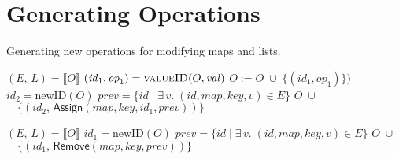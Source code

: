 \section{Generating Operations}\label{sect:appendix:generating-ops}

\begin{algorithm}
\caption{Generating new operations for modifying maps and lists.}\label{fig:pseudocode}
\noindent
\renewcommand\algorithmicindent{10pt}
\begin{minipage}[t]{0.5\textwidth}
\begin{algorithmic}[0]
    \State $(E,\, L) = \llbracket O \rrbracket$
    \State $(\mathit{id}_1, \mathit{op}_1) = \Call{valueID}{O, \mathit{val}}$
    \State $O := O \;\cup\; \big\{ (\mathit{id}_1, \mathit{op}_1) \big\})$
    \EndIf
    \State $\mathit{id}_2 = \mathrm{newID}(O)$
    \State $\mathit{prev} = \{ \mathit{id} \mid \exists\,v.\; (\mathit{id}, \mathit{map}, \mathit{key}, v) \in E \}$
    \State \Return $O \;\cup$
    \State $\quad\big\{ (\mathit{id}_2,\, \mathsf{Assign}(\mathit{map}, \mathit{key}, \mathit{id}_1, \mathit{prev})) \big\}$
    \EndFunction\Statex

    \State $(E,\, L) = \llbracket O \rrbracket$
    \State $\mathit{id}_1 = \mathrm{newID}(O)$
    \State $\mathit{prev} = \{ \mathit{id} \mid \exists\,v.\; (\mathit{id}, \mathit{map}, \mathit{key}, v) \in E \}$
    \State \Return $O \;\cup$
    \State $\quad\big\{ (\mathit{id}_1,\, \mathsf{Remove}(\mathit{map}, \mathit{key}, \mathit{prev})) \big\}$
    \EndFunction\Statex


\end{algorithmic}
\end{minipage}
\end{algorithm}
